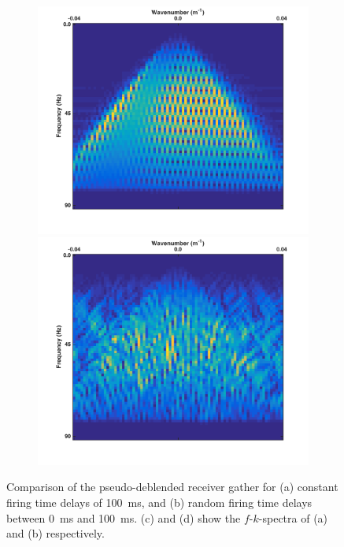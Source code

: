 \begin{figure}
\begin{subfigure}[b]{0.3\textwidth}
		\centering
		\includegraphics[width = \textwidth]{Plots/Mahdad/25iter/TimeDelay/FK-Pseudo-deblendedCRG_rec30_coh}
		\caption{}
		\label{fig:Ch-Theory-PseudoCRG-FK-CoherentDelay}
		
		\par\bigskip
		
		\centering
		\includegraphics[width = \textwidth]{Plots/Mahdad/25iter/TimeDelay/FK-Pseudo-deblendedCRG_rec30}
		\caption{}
		\label{fig:Ch-Theory-PseudoCRG-FK-IncoherentDelay}
		
	\end{subfigure}
	
	\caption{Comparison of the pseudo-deblended receiver gather for (a) constant firing time delays of \SI{100}{\milli\second}, and (b) random firing time delays between \SI{0}{\milli\second} and \SI{100}{\milli\second}. (c) and (d) show the $f$-$k$-spectra of (a) and (b) respectively.}
	\label{fig:Ch-Theory-PseudoCRG-IncoherencyEffect}

\end{figure}

